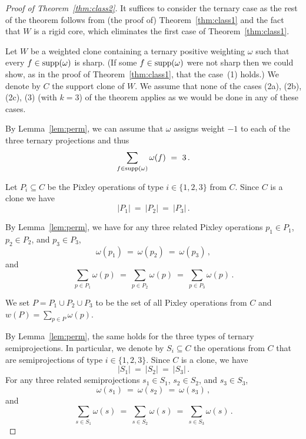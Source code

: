 \documentclass[11pt, reqno]{article}
\DeclareMathOperator{\supp}{{\rm supp}}
\theoremstyle{remark}
\begin{document}
\begin{proof}[Proof of Theorem~\ref{thm:class2}]
%
  It suffices to consider the ternary case as the rest of the theorem follows from (the proof
  of) Theorem~\ref{thm:class1} and the fact that $W$ is a rigid core, which
  eliminates the first case of Theorem~\ref{thm:class1}.
    
  Let $W$ be a weighted clone containing a ternary
  positive weighting $\omega$ such that every $f\in\supp(\omega)$ is sharp. 
  (If some $f\in\supp(\omega)$ were not sharp then we could show, as in the proof 
  of Theorem~\ref{thm:class1}, that the case~(1) holds.)
  We denote by $C$ the support clone of $W$.
  We assume that none of the cases (2a), (2b), (2c), (3) (with $k=3$) of the
  theorem applies as we would be done in any of these cases. 
  
  By Lemma~\ref{lem:perm}, we can assume that $\omega$ assigns
  weight $-1$ to each of the three ternary projections and thus
  \begin{equation}\label{eq:sum3} \sum_{f\in\supp(\omega)}\omega(f)\ =\ 3\,. \end{equation}
 
  Let $P_i\subseteq C$ be the Pixley operations of type
  $i\in\{1,2,3\}$ from $C$.   
  Since $C$ is a clone we have 
  \begin{equation}\label{eq:Pcard} |P_1|\ =\ |P_2|\ =\ |P_3|\,. \end{equation}

  By Lemma~\ref{lem:perm}, we have 
  for any three related Pixley operations $p_1\in P_1$, $p_2\in P_2$, and $p_3\in P_3$,
  \begin{equation}\label{eq:Prelated} \omega(p_1)\ =\ \omega(p_2)\ =\ \omega(p_3)\,, \end{equation}
  and
  \begin{equation}\label{eq:Pweights} 
  \sum_{p\in P_1} \omega(p)\ =\ \sum_{p\in P_2} \omega(p)\ =\ \sum_{p\in P_3}
  \omega(p)\,. \end{equation} 
 
  We set $P=P_1\cup P_2\cup P_3$ to be the set of all Pixley operations from
  $C$ and $w(P)=\sum_{p\in P}\omega(p)$. 

  By Lemma~\ref{lem:perm}, 
  the same holds for the three types of ternary semiprojections. 
  In particular, we denote by $S_i\subseteq C$ the operations from $C$ that are semiprojections of type $i\in\{1,2,3\}$. 
  Since $C$ is a clone, we have
  \begin{equation}\label{eq:Scard} 
  |S_1|\ =\ |S_2|\ =\ |S_3|\,. 
  \end{equation}
  For any three related
  semiprojections $s_1\in S_1$, $s_2\in S_2$, and $s_3\in S_3$, 
  \begin{equation}\label{eq:Srelated}
  \omega(s_1)\ =\ \omega(s_2)\ =\ \omega(s_3)\,,
  \end{equation}
  and
  \begin{equation}\label{eq:Sweights} 
  \sum_{s\in S_1} \omega(s)\ =\ \sum_{s\in S_2} \omega(s)\ =\ \sum_{s\in S_3} \omega(s)\,. 
  \end{equation} 


\end{proof}
\end{document}
